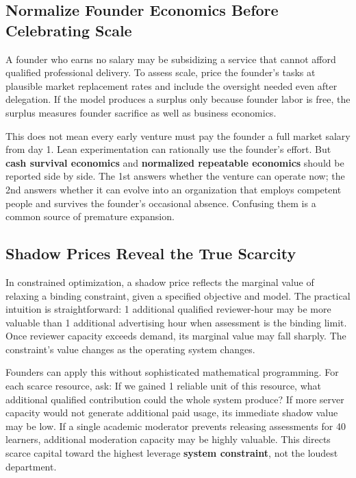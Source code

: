 \subsection{Normalize Founder Economics Before Celebrating Scale}
\label{sec:normalize_founder_economics}

A founder who earns no salary may be subsidizing a service that cannot afford qualified professional delivery. To assess scale, price the founder's tasks at plausible market replacement rates and include the oversight needed even after delegation. If the model produces a surplus only because founder labor is free, the surplus measures founder sacrifice as well as business economics.

This does not mean every early venture must pay the founder a full market salary from day 1. Lean experimentation can rationally use the founder's effort. But \textbf{cash survival economics} and \textbf{normalized repeatable economics} should be reported side by side. The 1st answers whether the venture can operate now; the 2nd answers whether it can evolve into an organization that employs competent people and survives the founder's occasional absence. Confusing them is a common source of premature expansion.

\subsection{Shadow Prices Reveal the True Scarcity}
\label{sec:shadow_prices_scarcity}

In constrained optimization, a shadow price reflects the marginal value of relaxing a binding constraint, given a specified objective and model. The practical intuition is straightforward: 1 additional qualified reviewer-hour may be more valuable than 1 additional advertising hour when assessment is the binding limit. Once reviewer capacity exceeds demand, its marginal value may fall sharply. The constraint's value changes as the operating system changes.

Founders can apply this without sophisticated mathematical programming. For each scarce resource, ask: If we gained 1 reliable unit of this resource, what additional qualified contribution could the whole system produce? If more server capacity would not generate additional paid usage, its immediate shadow value may be low. If a single academic moderator prevents releasing assessments for 40 learners, additional moderation capacity may be highly valuable. This directs scarce capital toward the highest leverage \textbf{system constraint}, not the loudest department.

